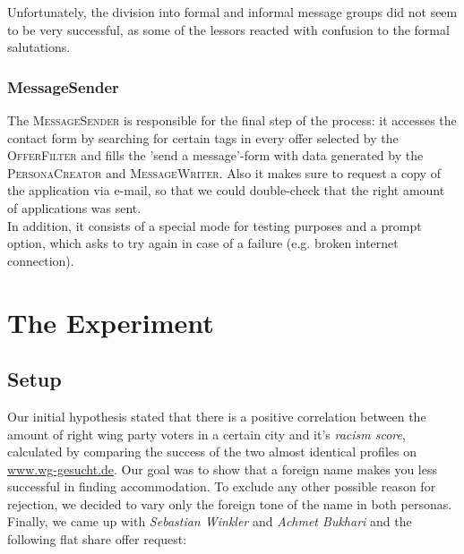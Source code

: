 \documentclass[11pt]{scrartcl}
\begin{document}
Unfortunately, the division into formal and informal message groups did not seem to be very successful, as some of the lessors reacted with confusion to the formal salutations.
\newpage
\subsubsection{MessageSender}
\begin{figure}[H]
        \centering
\end{figure}
The \textsc{MessageSender} is responsible for the final step of the process: it accesses the contact form by searching for certain tags in every offer selected by the \textsc{OfferFilter} and fills the 'send a message'-form with data generated by the \textsc{PersonaCreator} and \textsc{MessageWriter}. Also it makes sure to request a copy of the application via e-mail, so that we could double-check that the right amount of applications was sent.\\
In addition, it consists of a special mode for testing purposes and a prompt option, which asks to try again in case of a failure (e.g. broken internet connection).

\section{The Experiment}
\subsection{Setup}
\label{sec:ex_setup}
Our initial hypothesis stated that there is a positive correlation between the amount of right wing party voters in a certain city and it's \textit{racism score}, calculated by comparing the success of the two almost identical profiles on \url{www.wg-gesucht.de}. Our goal was to show that a foreign name makes you less successful in finding accommodation. To exclude any other possible reason for rejection, we decided to vary only the foreign tone of the name in both personas. Finally, we came up with \textit{Sebastian Winkler} and \textit{Achmet Bukhari} and the following flat share offer request:\\
\end{document}
